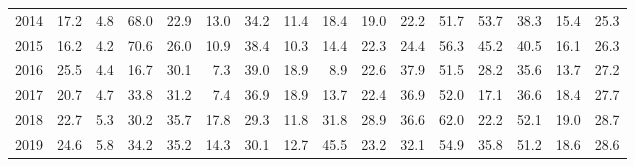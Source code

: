 \begin{tabular}{lrrrrrrrrrrrrrrr}
2014 &     17.2 &              4.8 &          68.0 &       22.9 &           13.0 &            34.2 &         11.4 &        18.4 &         19.0 &      22.2 &          51.7 &           53.7 &     38.3 &         15.4 &  25.3 \\
2015 &     16.2 &              4.2 &          70.6 &       26.0 &           10.9 &            38.4 &         10.3 &        14.4 &         22.3 &      24.4 &          56.3 &           45.2 &     40.5 &         16.1 &  26.3 \\
2016 &     25.5 &              4.4 &          16.7 &       30.1 &            7.3 &            39.0 &         18.9 &         8.9 &         22.6 &      37.9 &          51.5 &           28.2 &     35.6 &         13.7 &  27.2 \\
2017 &     20.7 &              4.7 &          33.8 &       31.2 &            7.4 &            36.9 &         18.9 &        13.7 &         22.4 &      36.9 &          52.0 &           17.1 &     36.6 &         18.4 &  27.7 \\
2018 &     22.7 &              5.3 &          30.2 &       35.7 &           17.8 &            29.3 &         11.8 &        31.8 &         28.9 &      36.6 &          62.0 &           22.2 &     52.1 &         19.0 &  28.7 \\
2019 &     24.6 &              5.8 &          34.2 &       35.2 &           14.3 &            30.1 &         12.7 &        45.5 &         23.2 &      32.1 &          54.9 &           35.8 &     51.2 &         18.6 &  28.6 \\
\bottomrule
\end{tabular}

